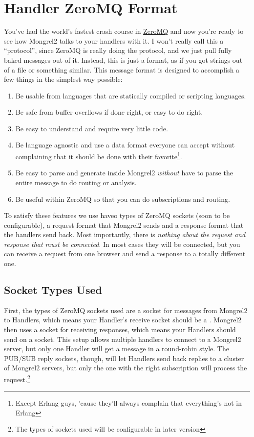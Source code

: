 \section{Handler ZeroMQ Format}

You've had the world's fastest crash course in \href{http://zeromq.org}{ZeroMQ} and now you're
ready to see how Mongrel2 talks to your handlers with it.  I won't really call this a ``protocol'',
since ZeroMQ is really doing the protocol, and we just pull fully baked messages out of it.  Instead,
this is just a format, as if you got strings out of a file or something similar.  This message
format is designed to accomplish a few things in the simplest way possible:

\begin{enumerate}
\item Be usable from languages that are statically compiled or scripting languages.
\item Be safe from buffer overflows if done right, or easy to do right.
\item Be easy to understand and require very little code.
\item Be language agnostic and use a data format everyone can accept without complaining
    that it should be done with their favorite\footnote{Except Erlang guys, 'cause they'll always
    complain that everything's not in Erlang}.
\item Be easy to parse and generate inside Mongrel2 \emph{without} have to parse the entire message
    to do routing or analysis.
\item Be useful within ZeroMQ so that you can do subscriptions and routing.
\end{enumerate}

To satisfy these features we use haveo types of ZeroMQ sockets (soon to be configurable),
a request format that Mongrel2 sends and a response format that the handlers send back.  Most
importantly, there is \emph{nothing about the request and response that must be connected}.  In most
cases they will be connected, but you can receive a request from one browser and send a response
to a totally different one.

\subsection{Socket Types Used}

First, the types of ZeroMQ sockets used are a  socket
for messages from Mongrel2 to Handlers, which means your Handler's receive
socket should be a .  Mongrel2 then uses a
 socket for receiving responses, which means your Handlers
should send on a  socket.  This setup
allows multiple handlers to connect to a Mongrel2 server, but only
one Handler will get a message in a round-robin style.  The PUB/SUB reply
sockets, though, will let Handlers send back replies to a cluster of
Mongrel2 servers, but only the one with the right subscription will
process the request.\footnote{The types of sockets used will be configurable
in later version}

